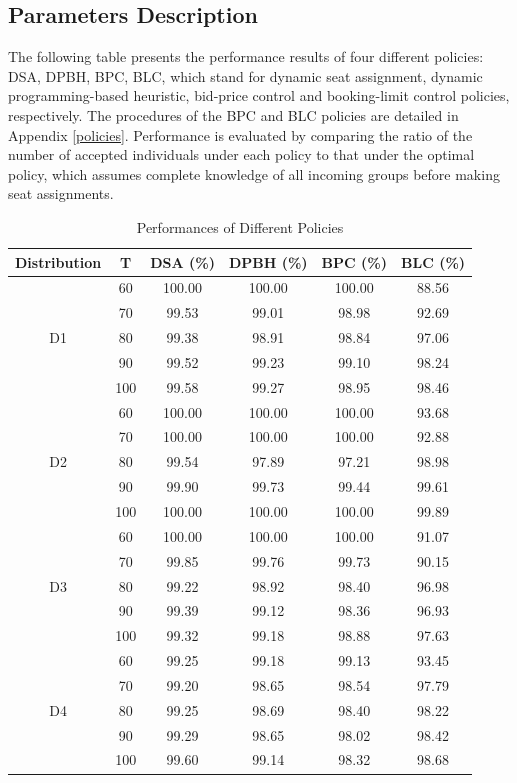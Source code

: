 \subsection*{Parameters Description}
The following table presents the performance results of four different policies: DSA, DPBH, BPC, BLC, which stand for dynamic seat assignment, dynamic programming-based heuristic, bid-price control and booking-limit control policies, respectively. The procedures of the BPC and BLC policies are detailed in Appendix \ref{policies}. Performance is evaluated by comparing the ratio of the number of accepted individuals under each policy to that under the optimal policy, which assumes complete knowledge of all incoming groups before making seat assignments.

\begin{table}[h]
  \centering
  \caption{Performances of Different Policies}
  \begin{tabular}{cc|cccc}
  \hline
  Distribution & T & DSA (\%) & DPBH (\%) & BPC (\%) & BLC (\%) \\
  \hline
  \multirow{5}{*}{D1} & 60 & 100.00 & 100.00 & 100.00 & 88.56 \\
  & 70    & 99.53 & 99.01 & 98.98 & 92.69  \\
  & 80    & 99.38 & 98.91 & 98.84 & 97.06  \\
  & 90    & 99.52 & 99.23 & 99.10 & 98.24  \\
  & 100   & 99.58 & 99.27 & 98.95 & 98.46 \\
  \hline
  \multirow{5}{*}{D2} & 60  & 100.00 & 100.00 & 100.00 & 93.68  \\
     & 70  & 100.00 & 100.00 & 100.00 & 92.88  \\
     & 80  & 99.54 & 97.89 & 97.21 & 98.98  \\
     & 90  & 99.90 & 99.73 & 99.44 & 99.61  \\
     & 100 & 100.00 & 100.00 & 100.00 & 99.89  \\ 
  \hline
  \multirow{5}{*}{D3} & 60  & 100.00 & 100.00 & 100.00 & 91.07  \\
  & 70  & 99.85 & 99.76 & 99.73 & 90.15 \\
  & 80  & 99.22 & 98.92 & 98.40 & 96.98  \\
  & 90  & 99.39 & 99.12 & 98.36 & 96.93  \\
  & 100  & 99.32 & 99.18 & 98.88 & 97.63  \\
    \hline
    \multirow{5}{*}{D4} & 60  & 99.25 & 99.18 & 99.13 & 93.45  \\
     & 70  & 99.20 & 98.65 & 98.54 & 97.79  \\
     & 80  & 99.25 & 98.69 & 98.40 & 98.22 \\
     & 90  & 99.29 & 98.65 & 98.02 & 98.42  \\
     & 100 & 99.60 & 99.14 & 98.32 & 98.68 \\
  \hline
  \end{tabular}
\end{table}

